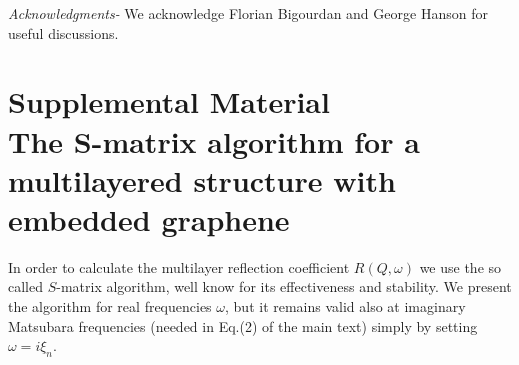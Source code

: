 \documentclass[aps,pra,superscriptaddress,amsmath,amssymb,showpacs,twocolumn,notitlepage]{revtex4-1}
\begin{document}
\emph{Acknowledgments-} We acknowledge Florian Bigourdan and {George Hanson} for useful discussions. 

\appendix


\section{Supplemental Material\\ The S-matrix algorithm for a multilayered structure with embedded graphene}\label{sec:SMatrix}
In order to calculate the multilayer reflection coefficient $R(Q,\omega)$ we use the so called $S$-matrix algorithm, well know for its effectiveness and stability. We present the algorithm for real frequencies $\omega$, but it remains valid also at imaginary Matsubara frequencies (needed in Eq.(2) of the main text) simply by setting $\omega=i\xi_n$.
\end{document}
